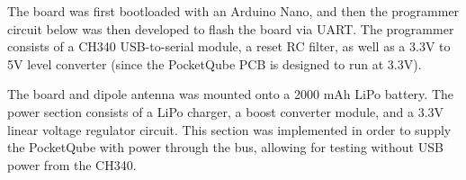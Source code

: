 The board was first bootloaded with an Arduino Nano, and then the programmer circuit below was then developed to flash the board via UART. The programmer consists of a CH340 USB-to-serial module, a reset RC filter, as well as a 3.3V to 5V level converter (since the PocketQube PCB is designed to run at 3.3V).

The board and dipole antenna was mounted onto a 2000 mAh LiPo battery. The power section consists of a LiPo charger, a boost converter module, and a 3.3V linear voltage regulator circuit. This section was implemented in order to supply the PocketQube with power through the bus, allowing for testing without USB power from the CH340.
